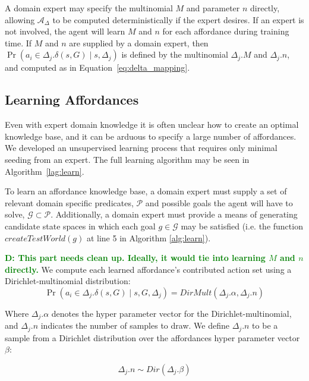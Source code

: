 \documentclass[conference]{IEEEtran}
\newcommand{\dnote}[1]{\textcolor{Green}{\textbf{D: #1}}}
\begin{document}
A domain expert may specify the multinomial $M$ and parameter $n$ directly,
allowing $\mathcal{A_\Delta}$ to be computed deterministically if 
the expert desires. If an expert is not involved, the agent will learn $M$ and
$n$ for each affordance during training time. If $M$ and $n$ are supplied
by a domain expert, then $\Pr(a_i \in \Delta_j.\delta(s,G) \mid s, \Delta_j)$ is
defined by the multinomial $\Delta_j.M$ and $\Delta_j.n$, and computed as in Equation~\ref{eq:delta_mapping}.

\subsection{Learning Affordances}

Even with expert domain knowledge it is often unclear how to create
an optimal knowledge base, and it can be arduous to specify a 
large number of affordances. We developed an unsupervised learning
process that requires only minimal seeding from an expert.
The full learning algorithm may be seen in Algorithm~\ref{lag:learn}.

To learn an affordance knowledge base, a domain 
expert must supply a set of relevant domain specific predicates,
$\mathcal{P}$ and possible goals the agent will have to solve, $\mathcal{G}
\subset \mathcal{P}$. Additionally, a domain expert must provide a means 
of generating candidate state spaces in which each goal $g \in \mathcal{G}$
 may be satisfied (i.e. the function $createTestWorld(g)$ at line 5 in Algorithm \ref{alg:learn}).

\dnote{This part needs clean up. Ideally, it would tie into learning $M$ and $n$ directly.}
We compute each learned affordance's contributed action set using a Dirichlet-multinomial distribution:
\begin{equation}
\Pr(a_i \in \Delta_j.\delta(s,G) \mid s, G, \Delta_j) = DirMult(\Delta_j.\alpha, \Delta_j.n)
\end{equation}

\noindent Where $\Delta_j.\alpha$ denotes the hyper parameter vector
for the Dirichlet-multinomial, and $\Delta_j.n$ indicates the number of
samples to draw. We define $\Delta_j.n$ to be a sample from a Dirichlet
distribution over the affordances hyper parameter vector $\beta$:

\begin{equation}
\Delta_j.n \sim Dir(\Delta_j.\beta)
\end{equation}
\end{document}
